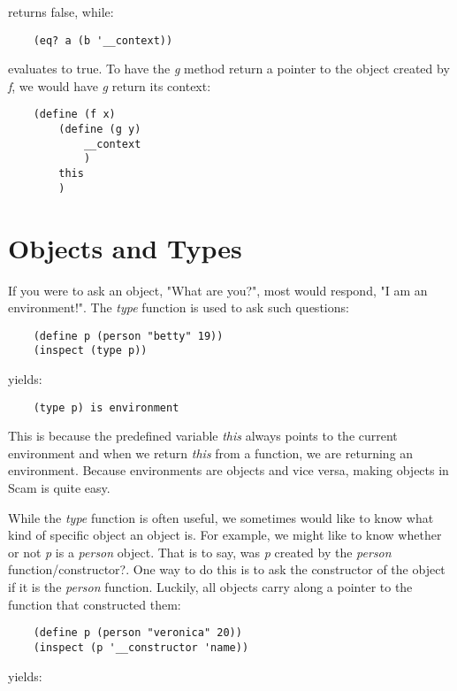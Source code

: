 returns false, while:

\begin{verbatim}
    (eq? a (b '__context))
\end{verbatim}

evaluates to true. To have the {\it g} method return a pointer to the object
created by {\it f}, we would have {\it g} return its context:

\begin{verbatim}
    (define (f x)
        (define (g y)
            __context
            )
        this
        )
\end{verbatim}

\section{Objects and Types}

If you were to ask an object, "What are you?", most
would respond, "I am an environment!". The {\it type} function is
used to ask such questions:

\begin{verbatim}
    (define p (person "betty" 19))
    (inspect (type p))
\end{verbatim}

yields:

\begin{verbatim}
    (type p) is environment
\end{verbatim}

This is because the predefined variable {\it this} always points to
the current environment and when we return {\it this} from a function,
we are returning an environment. Because environments are objects
and vice versa, making objects in Scam is quite easy.

While the {\it type} function is often useful, we sometimes 
would like to know what kind of specific object an object is.
For example, we might like to 
know whether or not {\it p} is a {\it person} object.
That is to say,
was {\it p} created by the {\it person} function/constructor?.
One way to do this
is to ask the constructor of the object if it is the {\it person} function.
Luckily, all objects carry along a pointer to the function
that constructed them:

\begin{verbatim}
    (define p (person "veronica" 20))
    (inspect (p '__constructor 'name))
\end{verbatim}

yields:

